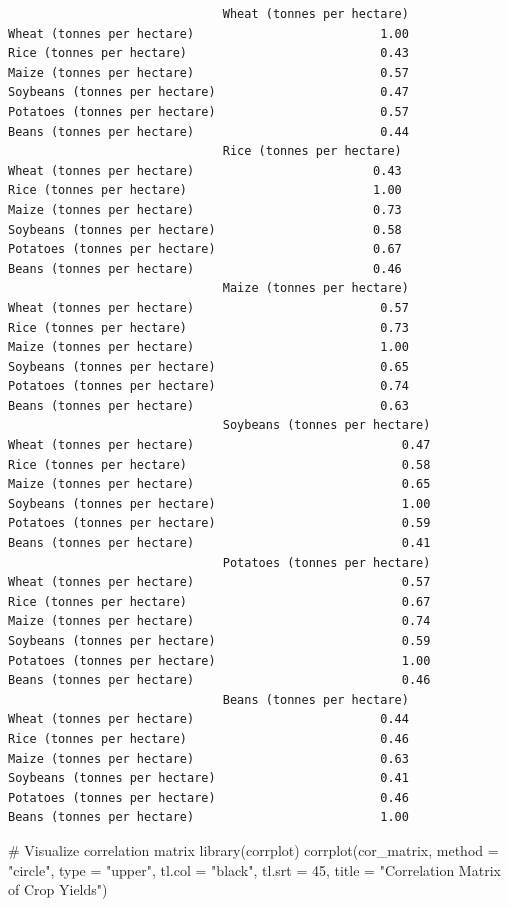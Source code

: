 \documentclass[
  letterpaper,
]{book}
\newenvironment{Shaded}{\begin{snugshade}}{\end{snugshade}}
\newcommand{\AttributeTok}[1]{\textcolor[rgb]{0.40,0.45,0.13}{#1}}
\newcommand{\CommentTok}[1]{\textcolor[rgb]{0.37,0.37,0.37}{#1}}
\newcommand{\DecValTok}[1]{\textcolor[rgb]{0.68,0.00,0.00}{#1}}
\newcommand{\FunctionTok}[1]{\textcolor[rgb]{0.28,0.35,0.67}{#1}}
\newcommand{\NormalTok}[1]{\textcolor[rgb]{0.00,0.23,0.31}{#1}}
\newcommand{\StringTok}[1]{\textcolor[rgb]{0.13,0.47,0.30}{#1}}
\begin{document}
\begin{verbatim}
                              Wheat (tonnes per hectare)
Wheat (tonnes per hectare)                          1.00
Rice (tonnes per hectare)                           0.43
Maize (tonnes per hectare)                          0.57
Soybeans (tonnes per hectare)                       0.47
Potatoes (tonnes per hectare)                       0.57
Beans (tonnes per hectare)                          0.44
                              Rice (tonnes per hectare)
Wheat (tonnes per hectare)                         0.43
Rice (tonnes per hectare)                          1.00
Maize (tonnes per hectare)                         0.73
Soybeans (tonnes per hectare)                      0.58
Potatoes (tonnes per hectare)                      0.67
Beans (tonnes per hectare)                         0.46
                              Maize (tonnes per hectare)
Wheat (tonnes per hectare)                          0.57
Rice (tonnes per hectare)                           0.73
Maize (tonnes per hectare)                          1.00
Soybeans (tonnes per hectare)                       0.65
Potatoes (tonnes per hectare)                       0.74
Beans (tonnes per hectare)                          0.63
                              Soybeans (tonnes per hectare)
Wheat (tonnes per hectare)                             0.47
Rice (tonnes per hectare)                              0.58
Maize (tonnes per hectare)                             0.65
Soybeans (tonnes per hectare)                          1.00
Potatoes (tonnes per hectare)                          0.59
Beans (tonnes per hectare)                             0.41
                              Potatoes (tonnes per hectare)
Wheat (tonnes per hectare)                             0.57
Rice (tonnes per hectare)                              0.67
Maize (tonnes per hectare)                             0.74
Soybeans (tonnes per hectare)                          0.59
Potatoes (tonnes per hectare)                          1.00
Beans (tonnes per hectare)                             0.46
                              Beans (tonnes per hectare)
Wheat (tonnes per hectare)                          0.44
Rice (tonnes per hectare)                           0.46
Maize (tonnes per hectare)                          0.63
Soybeans (tonnes per hectare)                       0.41
Potatoes (tonnes per hectare)                       0.46
Beans (tonnes per hectare)                          1.00
\end{verbatim}

\begin{Shaded}
\begin{Highlighting}[]
\CommentTok{\# Visualize correlation matrix}
\FunctionTok{library}\NormalTok{(corrplot)}
\FunctionTok{corrplot}\NormalTok{(cor\_matrix, }\AttributeTok{method =} \StringTok{"circle"}\NormalTok{, }\AttributeTok{type =} \StringTok{"upper"}\NormalTok{, }
         \AttributeTok{tl.col =} \StringTok{"black"}\NormalTok{, }\AttributeTok{tl.srt =} \DecValTok{45}\NormalTok{,}
         \AttributeTok{title =} \StringTok{"Correlation Matrix of Crop Yields"}\NormalTok{)}
\end{Highlighting}
\end{Shaded}
\end{document}

